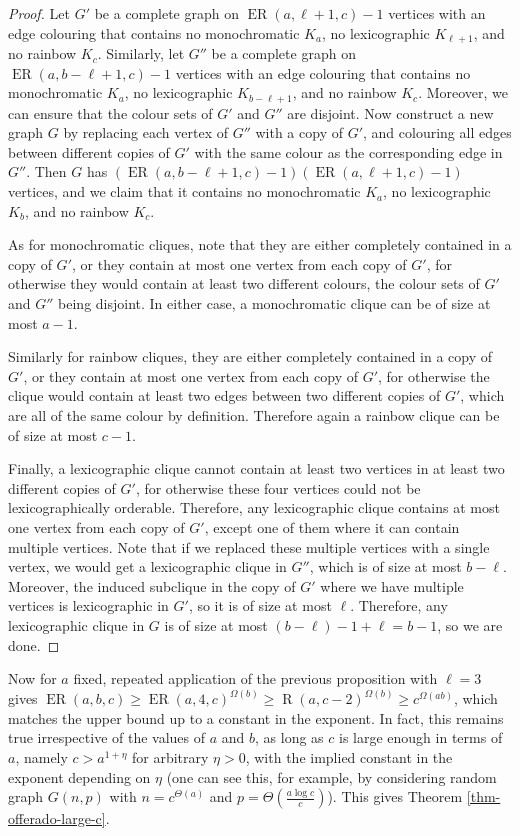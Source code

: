 \documentclass[11pt]{article}
\theoremstyle{plain}
\theoremstyle{definition}
\newcommand{\offerado}[3]{\operatorname{ER}(#1,#2,#3)}
\newcommand{\offram}[2]{\operatorname{R}(#1,#2)}
\begin{document}
\begin{proof}
    Let $G'$ be a complete graph on $\offerado{a}{\ell+1}{c}-1$ vertices with an edge colouring that contains no monochromatic $K_a$, no lexicographic $K_{\ell+1}$, and no rainbow $K_c$. Similarly, let $G''$ be a complete graph on $\offerado{a}{b-\ell+1}{c}-1$ vertices with an edge colouring that contains no monochromatic $K_a$, no lexicographic $K_{b-\ell+1}$, and no rainbow $K_c$. Moreover, we can ensure that the colour sets of $G'$ and $G''$ are disjoint. Now construct a new graph $G$ by replacing each vertex of $G''$ with a copy of $G'$, and colouring all edges between different copies of $G'$ with the same colour as the corresponding edge in $G''$. Then $G$ has $(\offerado{a}{b-\ell+1}{c}-1)(\offerado{a}{\ell+1}{c}-1)$ vertices, and we claim that it contains no monochromatic $K_a$, no lexicographic $K_b$, and no rainbow $K_c$.

    As for monochromatic cliques, note that they are either completely contained in a copy of $G'$, or they contain at most one vertex from each copy of $G'$, for otherwise they would contain at least two different colours, the colour sets of $G'$ and $G''$ being disjoint. In either case, a monochromatic clique can be of size at most $a-1$. 

    Similarly for rainbow cliques, they are either completely contained in a copy of $G'$, or they contain at most one vertex from each copy of $G'$, for otherwise the clique would contain at least two edges between two different copies of $G'$, which are all of the same colour by definition. Therefore again a rainbow clique can be of size at most $c-1$.

    Finally, a lexicographic clique cannot contain at least two vertices in at least two different copies of $G'$, for otherwise these four vertices could not be lexicographically orderable. Therefore, any lexicographic clique contains at most one vertex from each copy of $G'$, except one of them where it can contain multiple vertices. Note that if we replaced these multiple vertices with a single vertex, we would get a lexicographic clique in $G''$, which is of size at most $b-\ell$. Moreover, the induced subclique in the copy of $G'$ where we have multiple vertices is lexicographic in $G'$, so it is of size at most $\ell$. Therefore, any lexicographic clique in $G$ is of size at most $(b-\ell)-1+\ell=b-1$, so we are done. 
\end{proof}

Now for $a$ fixed, repeated application of the previous proposition with $\ell=3$ gives $\offerado{a}{b}{c}\ge \offerado{a}{4}{c}^{\Omega(b)} \ge \offram{a}{c-2}^{\Omega(b)} \ge c^{\Omega(ab)}$, which matches the upper bound up to a constant in the exponent. In fact, this remains true irrespective of the values of $a$ and $b$, as long as $c$ is large enough in terms of $a$, namely $c>a^{1+\eta}$ for arbitrary $\eta>0$, with the implied constant in the exponent depending on $\eta$ (one can see this, for example, by considering random graph $G(n,p)$ with $n=c^{\Theta(a)}$ and $p=\Theta(\frac{a\log c}{c})$). This gives Theorem \ref{thm-offerado-large-c}.
\end{document}
